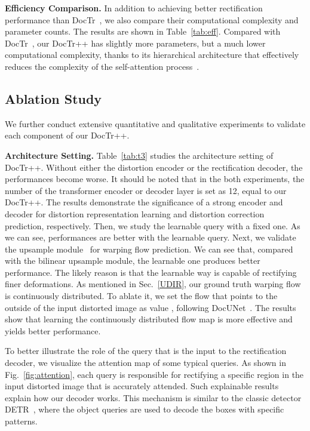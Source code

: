 \documentclass[lettersize,journal]{IEEEtran}
\begin{document}
\smallskip
\textbf{Efficiency Comparison.}
In addition to achieving better rectification performance than DocTr~\cite{feng2021doctr}, we also compare their computational complexity and parameter counts.
The results are shown in Table~\ref{tab:eff}.
Compared with DocTr~\cite{feng2021doctr}, 
our DocTr++ has slightly more parameters, but a much lower computational complexity, thanks to its hierarchical architecture that effectively reduces the  complexity of the self-attention process~\cite{Vaswani2017AttentionIA}.

\subsection{Ablation Study}
We further conduct extensive quantitative and qualitative experiments to validate each component of our DocTr++.

\smallskip
\textbf{Architecture Setting.}
Table~\ref{tab:t3} studies the architecture setting of DocTr++.
Without either the distortion encoder or the rectification decoder,
the performances become worse.
It should be noted that in the both experiments, the number of the transformer encoder or decoder layer is set as 12, equal to our DocTr++.
The results demonstrate the significance of a strong encoder and decoder for distortion representation learning and distortion correction prediction, respectively.
Then,
we study the learnable query with a fixed one.
As we can see,
performances are better with the learnable query.
Next,
we validate the upsample module~\cite{feng2021doctr} for warping flow prediction.
We can see that, compared with the bilinear upsample module, the learnable one produces better performance.
The likely reason is that the learnable way is capable of rectifying finer deformations.
As mentioned in Sec.~\ref{UDIR}, our ground truth warping flow is continuously distributed.
To ablate it, we set the flow that points to the outside of the input distorted image as value , following DocUNet~\cite{8578592}.
The results show that learning the continuously distributed flow map is more effective and yields better performance.


To better illustrate the role of the query that is the input to the rectification decoder, we visualize the attention map of some typical queries.
As shown in Fig.~\ref{fig:attention},
each query is responsible for rectifying a specific region in the input distorted image that is accurately attended.
Such explainable results explain how our decoder works.
This mechanism is similar to the classic detector DETR~\cite{carion2020end},
where the object queries are used to decode the boxes with specific patterns. 
\end{document}
